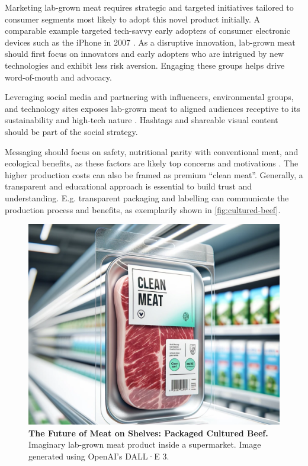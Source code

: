\documentclass[10pt]{article}
\begin{document}
\begin{sloppypar}
  Marketing lab-grown meat requires strategic and targeted initiatives tailored to consumer segments most likely to adopt this novel product initially. A comparable example targeted tech-savvy early adopters of consumer electronic devices such as the iPhone in 2007 \citep{vliert_apple_2021}. As a disruptive innovation, lab-grown meat should first focus on innovators and early adopters who are intrigued by new technologies and exhibit less risk aversion. Engaging these groups helps drive word-of-mouth and advocacy.

  Leveraging social media and partnering with influencers, environmental groups, and technology sites exposes lab-grown meat to aligned audiences receptive to its sustainability and high-tech nature \citep{goodwin_future_2013}. Hashtags and shareable visual content should be part of the social strategy.

  Messaging should focus on safety, nutritional parity with conventional meat, and ecological benefits, as these factors are likely top concerns and motivations \citep{circus_exploring_2018}. The higher production costs can also be framed as premium “clean meat”. Generally, a transparent and educational approach is essential to build trust and understanding. E.g. transparent packaging and labelling can communicate the production process and benefits, as exemplarily shown in \autoref{fig:cultured-beef}.

  \begin{figure}[ht]
    \centering
    \includegraphics[width=\textwidth]{figures/cultured-beef.png}
    \caption[Packaged Cultured Beef Product]{\textbf{The Future of Meat on Shelves: Packaged Cultured Beef.} Imaginary lab-grown meat product inside a supermarket. Image generated using OpenAI’s DALL·E 3.}
    \label{fig:cultured-beef}
  \end{figure}


\end{sloppypar}
\end{document}
